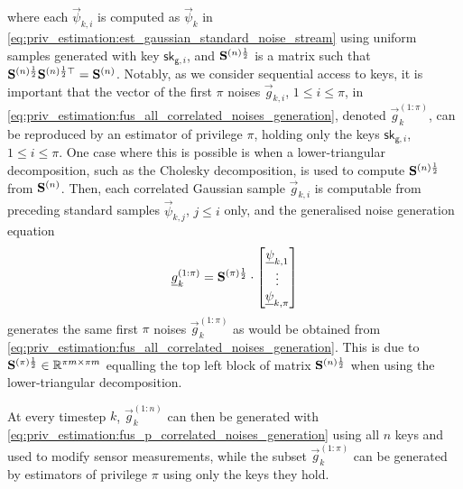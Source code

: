 where each $\vec{\psi}_{k, i}$ is computed as $\vec{\psi}_k$ in \eqref{eq:priv_estimation:est_gaussian_standard_noise_stream} using uniform samples generated with key $\mathsf{sk}_{\mathsf{g}, i}$, and ${{\mathbf{S}}}^{(n)\frac{1}{2}}$ is a matrix such that ${{\mathbf{S}}}^{(n)\frac{1}{2}}{{\mathbf{S}}}^{(n)\frac{1}{2}\top}={{\mathbf{S}}}^{(n)}$. Notably, as we consider sequential access to keys, it is important that the vector of the first $\pi$ noises $\vec{g}_{k, i}$, $1\leq i\leq \pi$, in \eqref{eq:priv_estimation:fus_all_correlated_noises_generation}, denoted $\vec{g}_k^{(1:\pi)}$, can be reproduced by an estimator of privilege $\pi$, holding only the keys $\mathsf{sk}_{\mathsf{g}, i}$, $1\leq i\leq \pi$. One case where this is possible is when a lower-triangular decomposition, such as the Cholesky decomposition, is used to compute ${{\mathbf{S}}}^{(n)\frac{1}{2}}$ from ${{\mathbf{S}}}^{(n)}$. Then, each correlated Gaussian sample $\vec{g}_{k,i}$ is computable from preceding standard samples $\vec{\psi}_{k,j}$, $j\leq i$ only, and the generalised noise generation equation
\begin{equation}\label{eq:priv_estimation:fus_p_correlated_noises_generation}
  {\underline{g}}_k^{(1:\pi)}=
  {{\mathbf{S}}}^{(\pi)\frac{1}{2}}\cdot
  \begin{bmatrix}
    {\underline{\psi}}_{k,1}\\
    \vdots\\
    {\underline{\psi}}_{k,\pi}
  \end{bmatrix}
\end{equation}
generates the same first $\pi$ noises $\vec{g}_k^{(1:\pi)}$ as would be obtained from \eqref{eq:priv_estimation:fus_all_correlated_noises_generation}. This is due to ${{\mathbf{S}}}^{(\pi)\frac{1}{2}}\in\mathbb{R}^{\pi m\times \pi m}$ equalling the top left block of matrix ${{\mathbf{S}}}^{(n)\frac{1}{2}}$ when using the lower-triangular decomposition.

At every timestep $k$, $\vec{g}_k^{(1:n)}$ can then be generated with \eqref{eq:priv_estimation:fus_p_correlated_noises_generation} using all $n$ keys and used to modify sensor measurements, while the subset $\vec{g}_k^{(1:\pi)}$ can be generated by estimators of privilege $\pi$ using only the keys they hold.

% 
% 

